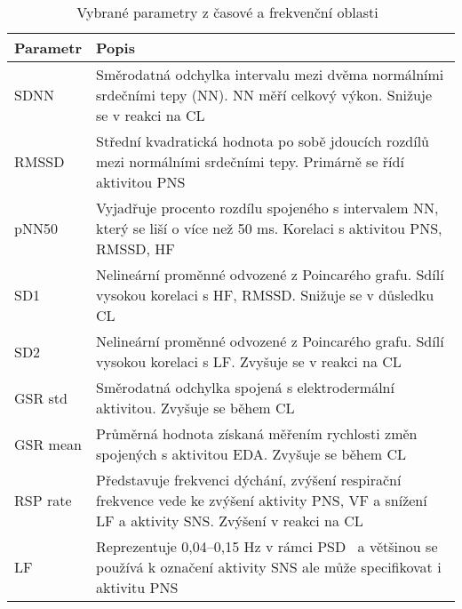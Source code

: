 \begin{table}[h!]
    \renewcommand{\arraystretch}{1.2}
    \scriptsize
    \centering
    \begin{threeparttable}
        \caption{Vybrané parametry z časové a frekvenční oblasti~\cite{Ishaque2021}}
        \label{tab:hrv_params}
        \begin{tabular}{p{2cm}p{12cm}}
            \toprule
            Parametr & Popis                                                                                                                                                        \\ \midrule
            SDNN     & Směrodatná odchylka intervalu mezi dvěma normálními srdečními tepy (NN). NN měří celkový výkon. Snižuje se v reakci na \gls{CL}                              \\
            RMSSD    & Střední kvadratická hodnota po sobě jdoucích rozdílů mezi normálními srdečními tepy. Primárně se řídí aktivitou \gls{PNS}                                    \\
            pNN50    & Vyjadřuje procento rozdílu spojeného s intervalem NN, který se liší o více než 50 ms. Korelaci s aktivitou \gls{PNS}, RMSSD, HF                              \\
            SD1      & Nelineární proměnné odvozené z Poincarého grafu. Sdílí vysokou korelaci s HF, RMSSD. Snižuje se v důsledku \gls{CL}                                          \\
            SD2      & Nelineární proměnné odvozené z Poincarého grafu. Sdílí vysokou korelaci s LF. Zvyšuje se v reakci na \gls{CL}                                                \\
            GSR std  & Směrodatná odchylka spojená s elektrodermální aktivitou. Zvyšuje se během \gls{CL}                                                                           \\
            GSR mean & Průměrná hodnota získaná měřením rychlosti změn spojených s aktivitou EDA. Zvyšuje se během \gls{CL}                                                         \\
            RSP rate & Představuje frekvenci dýchání, zvýšení respirační frekvence vede ke zvýšení aktivity \gls{PNS}, VF a snížení LF a aktivity SNS. Zvýšení v reakci na \gls{CL} \\
            LF       & Reprezentuje 0,04--0,15 Hz v rámci PSD\tnote{1} ~a většinou se používá k označení aktivity \gls{SNS} ale může specifikovat i aktivitu \gls{PNS}              \\

\end{tabular}
\end{threeparttable}
\end{table}
